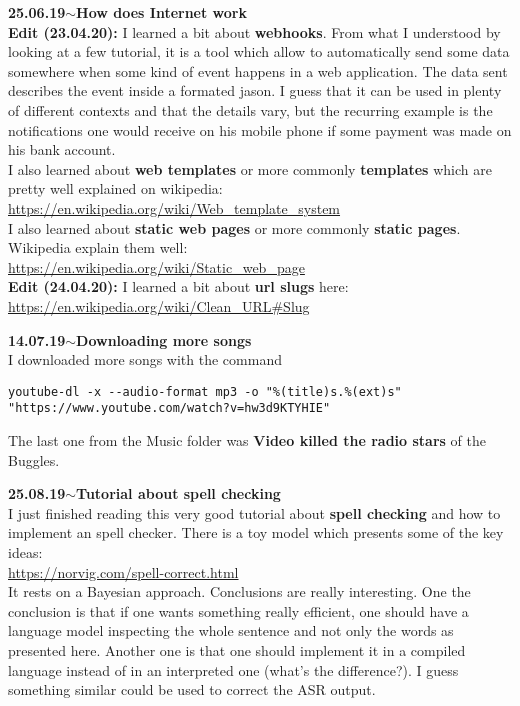 \documentclass[11pt,a4paper]{article}
\newenvironment{loggentry}[2]%
{\noindent\textbf{#1}\hspace{1cm}$\mathbf{\sim}$\text{ }\textbf{#2}\\}{\vspace{0.5cm}}
\begin{document}
\begin{loggentry}{25.06.19}{How does Internet work}
\textbf{Edit (23.04.20):} I learned a bit about \textbf{webhooks}. From what I understood by looking at a few tutorial, it is a tool which allow to automatically send some data somewhere when some kind of event happens in a web application. The data sent describes the event inside a formated jason. I guess that it can be used in plenty of different contexts and that the details vary, but the recurring example is the notifications one would receive on his mobile phone if some payment was made on his bank account.\\
I also learned about \textbf{web templates} or more commonly \textbf{templates} which are pretty well explained on wikipedia:\\
\url{https://en.wikipedia.org/wiki/Web_template_system}\\
I also learned about \textbf{static web pages} or more commonly \textbf{static pages}. Wikipedia explain them well:\\
\url{https://en.wikipedia.org/wiki/Static_web_page}\\
\textbf{Edit (24.04.20):} I learned a bit about \textbf{url slugs} here:\\
\url{https://en.wikipedia.org/wiki/Clean_URL#Slug}\\

\end{loggentry}

\begin{loggentry}{14.07.19}{Downloading more songs}
I downloaded more songs with the command
\begin{verbatim}
youtube-dl -x --audio-format mp3 -o "%(title)s.%(ext)s" "https://www.youtube.com/watch?v=hw3d9KTYHIE"
\end{verbatim}
The last one from the Music folder was \textbf{Video killed the radio stars} of the Buggles. 
\end{loggentry}


\begin{loggentry}{25.08.19}{Tutorial about spell checking}

I just finished reading this very good tutorial about \textbf{spell checking} and how to implement an spell checker.  There is a toy model which presents some of the key ideas:\\
\url{https://norvig.com/spell-correct.html}\\
It rests on a Bayesian approach. Conclusions are really interesting. One the conclusion is that if one wants something really efficient, one should have a language model inspecting the whole sentence and not only the words as presented here. Another one is that one should implement it in a compiled language instead of in an interpreted one (what's the difference?). I guess something similar could be used to correct the ASR output.

\end{loggentry}
\end{document}
